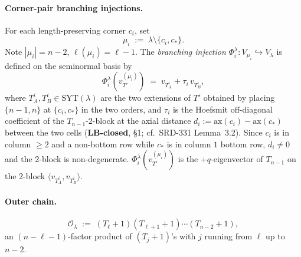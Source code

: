 \documentclass[11pt]{article}
\theoremstyle{definition}
\begin{document}
\paragraph{Corner-pair branching injections.}
For each length-preserving corner $c_i$, set
\[
   \mu_i \;:=\; \lambda \setminus \{c_i, c_*\}.
\]
Note $|\mu_i| = n - 2$, $\ell(\mu_i) = \ell - 1$. The
\emph{branching injection}
$\Phi_i^\lambda : V_{\mu_i} \hookrightarrow V_\lambda$ is defined
on the seminormal basis by
\[
   \Phi_i^\lambda(v_{T'}^{(\mu_i)})
   \;=\;
   v_{T_A^i} + \tau_i\, v_{T_B^i},
\]
where $T_A^i, T_B^i \in \mathrm{SYT}(\lambda)$ are the two extensions
of $T'$ obtained by placing $\{n-1, n\}$ at $\{c_i, c_*\}$ in the two
orders, and $\tau_i$ is the Hoefsmit off-diagonal coefficient of the
$T_{n-1}$-2-block at the axial distance
$d_i := \mathrm{ax}(c_i) - \mathrm{ax}(c_*)$ between the two cells
(\textbf{LB-closed}, \S 1; cf.~SRD-331 Lemma~3.2). Since $c_i$ is in
column $\ge 2$ and a non-bottom row while $c_*$ is in column $1$
bottom row, $d_i \ne 0$ and the 2-block is non-degenerate.
$\Phi_i^\lambda(v_{T'}^{(\mu_i)})$ is the $+q$-eigenvector of
$T_{n-1}$ on the 2-block $\langle v_{T_A^i}, v_{T_B^i} \rangle$.

\paragraph{Outer chain.}
\[
   \mathcal{O}_\lambda \;:=\;
   (T_\ell{+}1)(T_{\ell+1}{+}1)\cdots(T_{n-2}{+}1),
\]
an $(n - \ell - 1)$-factor product of $(T_j+1)$'s with $j$ running
from $\ell$ up to $n - 2$.
\end{document}
